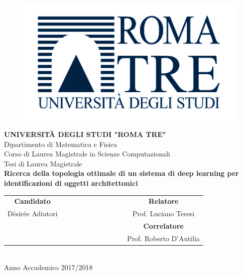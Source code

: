 \documentclass[a4paper,12pt]{report}
\begin{document}
\lstset{language=Python, showspaces=false, showstringspaces=false}
\thispagestyle{empty}
\begin{figure}
\centering
\includegraphics[scale=0.30]{Logo}
\end{figure}
\begin{center}
\textbf{UNIVERSIT\`{A} DEGLI STUDI "ROMA TRE"}\\
\textmd{\large Dipartimento di Matematica e Fisica}\\
\large{ Corso di Laurea Magistrale in Scienze Computazionali}\\	
\vspace{1.35cm}	
\textmd{\Large{Tesi di Laurea Magistrale}}\\
\vspace{1.5cm}
\LARGE{\LARGE{\textbf{Ricerca della topologia ottimale di un sistema di deep learning per identificazioni di oggetti architettonici}}}\\
\vspace{4.6cm}
\begin{tabular}{ccccccccccc}
	\large{\textbf{Candidato}}& & & & & & & & & & \large{\textbf{Relatore}}\\
	\large{D\'{e}sir\'{e}e Adiutori} & & & & & & & & & &\large{Prof. Luciano Teresi}\\
	& & & & & & & & & & \large{\textbf{Correlatore}}\\
	& & & & & & & & & & \large{Prof. Roberto D'Autilia}
\end{tabular}\\
\vspace{2.4cm}
\normalsize{Anno Accademico 2017/2018}
\end{center}
\newpage
\tableofcontents

\newpage
\end{document}
